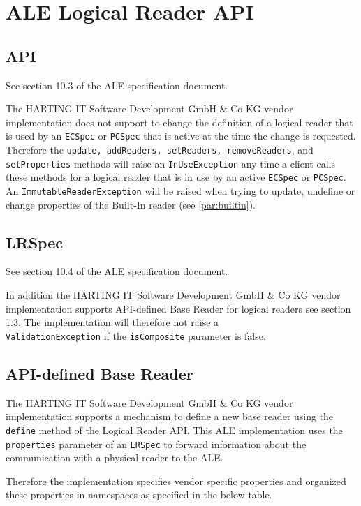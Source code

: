 \documentclass[11pt,a4paper,oneside]{article}
\newif\ifincludecc
\begin{document}
\section{ALE Logical Reader API}

\subsection{API}

See section 10.3 of the ALE specification document.

The HARTING IT Software Development GmbH \& Co KG vendor implementation does not support to change the definition of a logical reader that is used by an \texttt{ECSpec\ifincludecc , CCSpec \fi} or \texttt{PCSpec} that is active at the time the change is requested. Therefore the \texttt{update, addReaders, setReaders, removeReaders}, and \texttt{setProperties} methods will raise an \texttt{InUseException} any time a client calls these methods for a logical reader that is in use by an active \texttt{ECSpec\ifincludecc , CCSpec \fi} or \texttt{PCSpec}. An \texttt{ImmutableReaderException} will be raised when trying to update, undefine or change properties of the Built-In reader (see \ref{par:builtin}).

\subsection{LRSpec}
See section 10.4 of the ALE specification document.

In addition the HARTING IT Software Development GmbH \& Co KG vendor implementation supports API-defined Base Reader for logical readers see section \ref{subsec:APIdef}. The implementation will therefore not raise a \\
\texttt{ValidationException} if the \texttt{isComposite} parameter is false.

\subsection{API-defined Base Reader}
\label{subsec:APIdef}
The HARTING IT Software Development GmbH \& Co KG vendor implementation supports a mechanism to define a new base reader using the \texttt{define} method of the Logical Reader API. This ALE implementation uses the \texttt{properties} parameter of an \texttt{LRSpec} to forward information about the communication with a physical reader to the ALE. 

Therefore the implementation specifies vendor specific properties and organized these properties in namespaces as specified in the below table.
\end{document}
